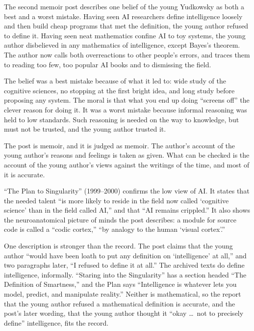 \begin{afterword}
\summaryhead

The second memoir post describes one belief of the young Yudkowsky as both a best and a worst mistake. Having seen AI researchers define intelligence loosely and then build cheap programs that met the definition, the young author refused to define it. Having seen neat mathematics confine AI to toy systems, the young author disbelieved in any mathematics of intelligence, except Bayes's theorem. The author now calls both overreactions to other people's errors, and traces them to reading too few, too popular AI books and to dismissing the field.

The belief was a best mistake because of what it led to: wide study of the cognitive sciences, no stopping at the first bright idea, and long study before proposing any system. The moral is that what you end up doing ``screens off'' the clever reason for doing it. It was a worst mistake because informal reasoning was held to low standards. Such reasoning is needed on the way to knowledge, but must not be trusted, and the young author trusted it.

\responsehead

The post is memoir, and it is judged as memoir. The author's account of the young author's reasons and feelings is taken as given. What can be checked is the account of the young author's views against the writings of the time, and most of it is accurate.

``The Plan to Singularity'' (1999--2000) confirms the low view of AI. It states that the needed talent ``is more likely to reside in the field now called `cognitive science' than in the field called AI,'' and that ``AI remains crippled.'' It also shows the neuroanatomical picture of minds the post describes: a module for source code is called a ``codic cortex,'' ``by analogy to the human `visual cortex'.''

One description is stronger than the record. The post claims that the young author ``would have been loath to put any definition on `intelligence' at all,'' and two paragraphs later, ``I refused to define it at all.'' The archived texts do define intelligence, informally. ``Staring into the Singularity'' has a section headed ``The Definition of Smartness,'' and the Plan says ``Intelligence is whatever lets you model, predict, and manipulate reality.'' Neither is mathematical, so the report that the young author refused a mathematical definition is accurate, and the post's later wording, that the young author thought it ``okay \ldots\ not to precisely define'' intelligence, fits the record.


\end{afterword}
